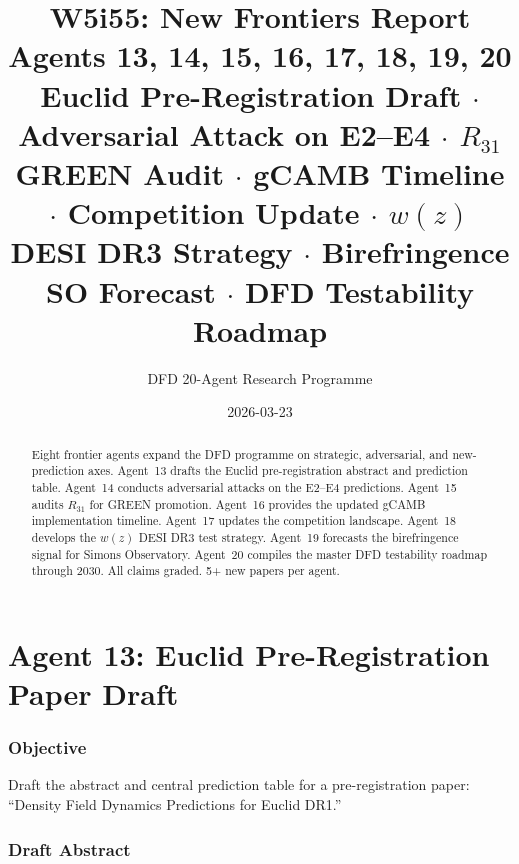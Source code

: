 \documentclass[11pt,a4paper]{article}
\title{\Huge W5i55: New Frontiers Report\\[12pt]
\Large Agents 13, 14, 15, 16, 17, 18, 19, 20\\[6pt]
\large Euclid Pre-Registration Draft $\cdot$ Adversarial Attack on E2--E4 $\cdot$ $R_{31}$ GREEN Audit $\cdot$ gCAMB Timeline $\cdot$ Competition Update $\cdot$ $w(z)$ DESI DR3 Strategy $\cdot$ Birefringence SO Forecast $\cdot$ DFD Testability Roadmap}
\author{DFD 20-Agent Research Programme}
\date{2026-03-23}
\begin{document}
\maketitle

\begin{abstract}
Eight frontier agents expand the DFD programme on strategic, adversarial, and new-prediction axes. Agent~13 drafts the Euclid pre-registration abstract and prediction table. Agent~14 conducts adversarial attacks on the E2--E4 predictions. Agent~15 audits $R_{31}$ for GREEN promotion. Agent~16 provides the updated gCAMB implementation timeline. Agent~17 updates the competition landscape. Agent~18 develops the $w(z)$ DESI DR3 test strategy. Agent~19 forecasts the birefringence signal for Simons Observatory. Agent~20 compiles the master DFD testability roadmap through 2030. All claims graded. 5+ new papers per agent.
\end{abstract}

\tableofcontents
\newpage


\part{Agent 13: Euclid Pre-Registration Paper Draft}
\label{part:euclid-draft}

\section{Objective}

Draft the abstract and central prediction table for a pre-registration paper: ``Density Field Dynamics Predictions for Euclid DR1.''

\section{Draft Abstract}
\end{document}
